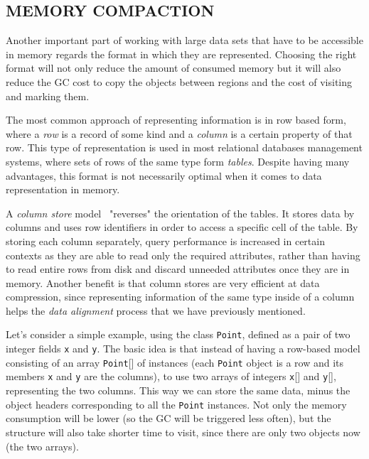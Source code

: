 \documentclass[a4paper,twoside]{article}
\begin{document}
\subsection{\uppercase{Memory Compaction}}
\label{subsec:compaction}

Another important part of working with large data sets that have to be accessible in memory regards the format in which they are represented.
Choosing the right format will not only reduce the amount of consumed memory but it will also reduce the GC cost to copy the objects between regions and the cost of visiting and marking them.

The most common approach of representing information is in row based form, where a {\textit{row}} is a record of some kind and a {\textit{column}} is a certain property of that row.
This type of representation is used in most relational databases management systems, where sets of rows of the same type form {\textit{tables}}.
Despite having many advantages, this format is not necessarily optimal when it comes to data representation in memory.

A {\textit{column store}} model~\cite{abadi:2013} "reverses" the orientation of the tables.
It stores data by columns and uses row identifiers in order to access a specific cell of the table.
By storing each column separately, query performance is increased in certain contexts as they are able to read only the required attributes, rather than having to read entire rows from disk and discard unneeded attributes once they are in memory.
Another benefit is that column stores are very efficient at data compression, since representing information of the same type inside of a column helps the {\textit{data alignment}} process that we have previously mentioned.

Let's consider a simple example, using the class \texttt{Point}, defined as a pair of two integer fields \texttt{x} and \texttt{y}.
The basic idea is that instead of having a row-based model consisting of an array {\texttt{Point}[]} of instances (each {\texttt{Point}} object is a row and its members \texttt{x} and \texttt{y} are the columns), to use two arrays of integers {\texttt{x}[]} and {\texttt{y}[]}, representing the two columns.
This way we can store the same data, minus the object headers corresponding to all the {\texttt{Point}} instances.
Not only the memory consumption will be lower (so the GC will be triggered less often), but the structure will also take shorter time to visit, since there are only two objects now (the two arrays).
\end{document}
